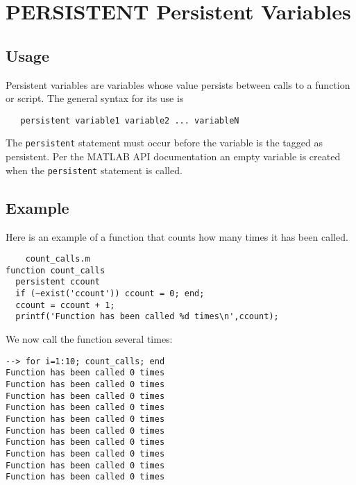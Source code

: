 \section{PERSISTENT Persistent Variables}

\subsection{Usage}

Persistent variables are variables whose value persists between
calls to a function or script.  The general syntax for its
use is
\begin{verbatim}
   persistent variable1 variable2 ... variableN
\end{verbatim}
The \verb|persistent| statement must occur before the variable
is the tagged as persistent.  Per the MATLAB API documentation
an empty variable is created when the \verb|persistent| statement
is called.
\subsection{Example}

Here is an example of a function that counts how many
times it has been called.
\begin{verbatim}
    count_calls.m
function count_calls
  persistent ccount
  if (~exist('ccount')) ccount = 0; end;
  ccount = ccount + 1;
  printf('Function has been called %d times\n',ccount);
\end{verbatim}
We now call the function several times:
\begin{verbatim}
--> for i=1:10; count_calls; end
Function has been called 0 times
Function has been called 0 times
Function has been called 0 times
Function has been called 0 times
Function has been called 0 times
Function has been called 0 times
Function has been called 0 times
Function has been called 0 times
Function has been called 0 times
Function has been called 0 times
\end{verbatim}
